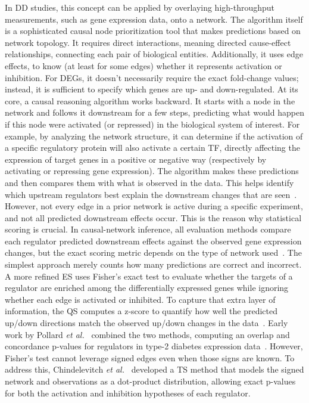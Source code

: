 In \gls{DD} studies, this concept can be applied by overlaying high-throughput measurements, such as gene expression data, onto a network. 
The algorithm itself is a sophisticated causal node prioritization tool that makes predictions based on network topology. 
It requires direct interactions, meaning directed cause-effect relationships, connecting each pair of biological entities. 
Additionally, it uses edge effects, to know (at least for some edges) whether it represents activation or inhibition. 
For \gls{DEGs}, it doesn't necessarily require the exact fold-change values; instead, it is sufficient to specify which genes are up- and down-regulated. 
At its core, a causal reasoning algorithm works backward. 
It starts with a node in the network and follows it downstream for a few steps, predicting what would happen if this node were activated (or repressed) in the biological system of interest. 
For example, by analyzing the network structure, it can determine if the activation of a specific regulatory protein will also activate a certain TF, directly affecting the expression of target genes in a positive or negative way (respectively by activating or repressing gene expression). 
The algorithm makes these predictions and then compares them with what is observed in the data. 
This helps identify which upstream regulators best explain the downstream changes that are seen~\cite{RN32}. However, not every edge in a prior network is active during a specific experiment, and not all predicted downstream effects occur. 
This is the reason why statistical scoring is crucial. In causal-network inference, all evaluation methods compare each regulator predicted downstream effects against the observed gene expression changes, but the exact scoring metric depends on the type of network used~\cite{RN81}. 
The simplest approach merely counts how many predictions are correct and incorrect. A more refined \gls{ES} uses Fisher's exact test to evaluate whether the targets of a regulator are enriched among the differentially expressed genes while ignoring whether each edge is activated or inhibited. 
To capture that extra layer of information, the \gls{QS} computes a z-score to quantify how well the predicted up/down directions match the observed up/down changes in the data~\cite{RN156}. 
Early work by Pollard \textit{et al.}~\cite{RN135} combined the two methods, computing an overlap and concordance p-values for regulators in type-2 diabetes expression data~\cite{RN156}.  
However, Fisher's test cannot leverage signed edges even when those signs are known. To address this, Chindelevitch \textit{et al.}~\cite{RN73, RN131} developed a \gls{TS} method that models the signed network and observations as a dot-product distribution, allowing exact p-values for both the activation and inhibition hypotheses of each regulator. 
